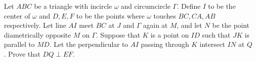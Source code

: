 Let $ABC$ be a triangle with incircle $\omega$ and circumcircle $\Gamma$. Define $I$ to be the center of $\omega$ and $D,E,F$ to be the points where $\omega$ touches $BC,CA,AB$ respectively. Let line $AI$ meet $BC$ at $J$ and $\Gamma$ again at $M$, and let $N$ be the point diametrically opposite $M$ on $\Gamma$. Suppose that $K$ is a point on $ID$ such that $JK$ is parallel to $MD$. Let the perpendicular to $AI$ passing through $K$ intersect $IN$ at $Q$. Prove that $DQ\perp EF$.
